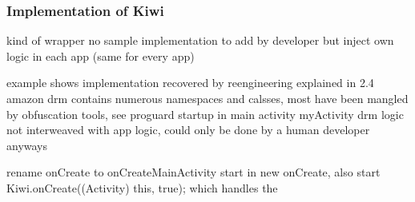 \subsubsection{Implementation of Kiwi} \label{section:license-amazon-implementation}
kind of wrapper
no sample implementation to add by developer but inject own logic in each app (same for every app)

example shows implementation recovered by reengineering explained in 2.4
amazon drm contains numerous namespaces and calsses, most have been mangled by obfuscation tools, see proguard
startup in main activity myActivity
drm logic not interweaved with app logic, could only be done by a human developer anyways

\cite{munteanLicense}
%




rename onCreate to onCreateMainActivity
start in new onCreate, also start Kiwi.onCreate((Activity) this, true); which handles the
